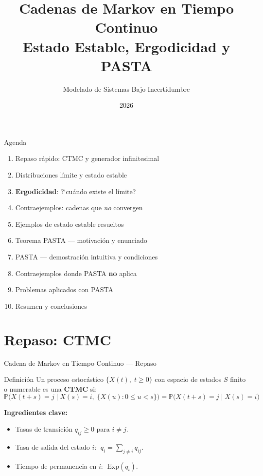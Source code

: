 \documentclass[aspectratio=1610, 10pt]{beamer}
\title[CTMC: Estado Estable \& PASTA]{%
  Cadenas de Markov en Tiempo Continuo\\[4pt]
  \large Estado Estable, Ergodicidad y PASTA}
\author{Modelado de Sistemas Bajo Incertidumbre}
\date{2026}
\newcommand{\Prob}{\mathbb{P}}
\begin{document}
\begin{frame}
  \titlepage
\end{frame}

\begin{frame}{Agenda}
  \begin{enumerate}
    \item Repaso r\'{a}pido: CTMC y generador infinitesimal
    \item Distribuciones l\'{i}mite y estado estable
    \item \textbf{Ergodicidad}: ?`cu\'{a}ndo existe el l\'{i}mite?
    \item Contraejemplos: cadenas que \emph{no} convergen
    \item Ejemplos de estado estable resueltos
    \item Teorema PASTA --- motivaci\'{o}n y enunciado
    \item PASTA --- demostraci\'{o}n intuitiva y condiciones
    \item Contraejemplos donde PASTA \textbf{no} aplica
    \item Problemas aplicados con PASTA
    \item Resumen y conclusiones
  \end{enumerate}
\end{frame}

\section{Repaso: CTMC}

\begin{frame}{Cadena de Markov en Tiempo Continuo --- Repaso}
  \begin{block}{Definici\'{o}n}
    Un proceso estoc\'{a}stico $\{X(t),\; t\ge 0\}$ con espacio de estados
    $S$ finito o numerable es una \textbf{CTMC} si:
    \[
      \Prob\!\bigl(X(t+s)=j \mid X(s)=i,\; \{X(u): 0\le u < s\}\bigr)
      = \Prob\!\bigl(X(t+s)=j \mid X(s)=i\bigr)
    \]
  \end{block}
  \vspace{6pt}
  \textbf{Ingredientes clave:}
  \begin{itemize}
    \item Tasas de transici\'{o}n $q_{ij}\ge 0$ para $i\neq j$.
    \item Tasa de salida del estado $i$: $\;q_i = \sum_{j\neq i} q_{ij}$.
    \item Tiempo de permanencia en $i$: $\;\text{Exp}(q_i)$.
  \end{itemize}
\end{frame}
\end{document}
